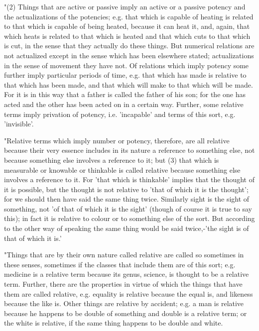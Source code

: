 "(2) Things that are active or passive imply an active or a passive
potency and the actualizations of the potencies; e.g. that which is
capable of heating is related to that which is capable of being heated,
because it can heat it, and, again, that which heats is related to
that which is heated and that which cuts to that which is cut, in
the sense that they actually do these things. But numerical relations
are not actualized except in the sense which has been elsewhere stated;
actualizations in the sense of movement they have not. Of relations
which imply potency some further imply particular periods of time,
e.g. that which has made is relative to that which has been made,
and that which will make to that which will be made. For it is in
this way that a father is called the father of his son; for the one
has acted and the other has been acted on in a certain way. Further,
some relative terms imply privation of potency, i.e. 'incapable' and
terms of this sort, e.g. 'invisible'. 

"Relative terms which imply number or potency, therefore, are all
relative because their very essence includes in its nature a reference
to something else, not because something else involves a reference
to it; but (3) that which is measurable or knowable or thinkable is
called relative because something else involves a reference to it.
For 'that which is thinkable' implies that the thought of it is possible,
but the thought is not relative to 'that of which it is the thought';
for we should then have said the same thing twice. Similarly sight
is the sight of something, not 'of that of which it is the sight'
(though of course it is true to say this); in fact it is relative
to colour or to something else of the sort. But according to the other
way of speaking the same thing would be said twice,-'the sight is
of that of which it is.' 

"Things that are by their own nature called relative are called so
sometimes in these senses, sometimes if the classes that include them
are of this sort; e.g. medicine is a relative term because its genus,
science, is thought to be a relative term. Further, there are the
properties in virtue of which the things that have them are called
relative, e.g. equality is relative because the equal is, and likeness
because the like is. Other things are relative by accident; e.g. a
man is relative because he happens to be double of something and double
is a relative term; or the white is relative, if the same thing happens
to be double and white. 


